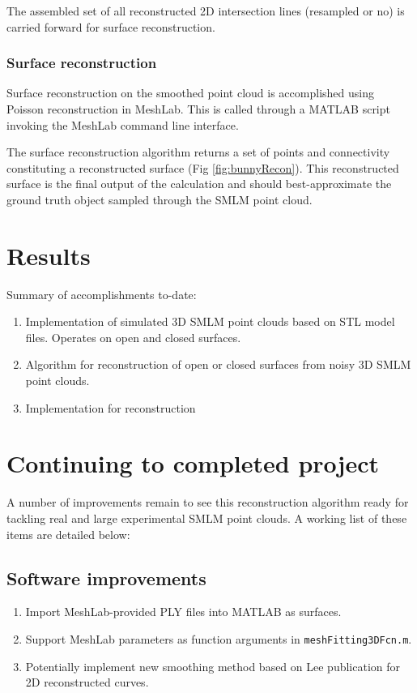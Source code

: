 \documentclass[10pt,a4paper]{article}
\begin{document}
The assembled set of all reconstructed 2D intersection lines (resampled or no) is carried forward for surface reconstruction.


\subsubsection{Surface reconstruction}

Surface reconstruction on the smoothed point cloud is accomplished using Poisson reconstruction \cite{kazhdan2006poisson} in MeshLab.  This is called through a MATLAB script invoking the MeshLab command line interface. 

The surface reconstruction algorithm returns a set of points and connectivity constituting a reconstructed surface (Fig \ref{fig:bunnyRecon}).  This reconstructed surface is the final output of the calculation and should best-approximate the ground truth object sampled through the SMLM point cloud. 

\section{Results}

Summary of accomplishments to-date:
\begin{enumerate}
	\item Implementation of simulated 3D SMLM point clouds based on STL model files.  Operates on open and closed surfaces.
	\item Algorithm for reconstruction of open or closed surfaces from noisy 3D SMLM point clouds.
	\item Implementation for reconstruction 
\end{enumerate}

\section{Continuing to completed project}

A number of improvements remain to see this reconstruction algorithm ready for tackling real and large experimental SMLM point clouds. A working list of these items are detailed below:

\subsection{Software improvements}
\begin{enumerate}
	\item Import MeshLab-provided PLY files into MATLAB as surfaces. 
	\item Support MeshLab parameters as function arguments in \texttt{meshFitting3DFcn.m}.
	\item Potentially implement new smoothing method based on Lee publication for 2D reconstructed curves.
\end{enumerate}
\end{document}
